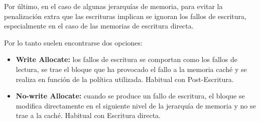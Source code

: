 Por último, en el caso de algunas jerarquías de memoria, para evitar la penalización extra que las escrituras implican se ignoran los fallos de escritura, especialmente en el caso de las memorias de escritura directa.

Por lo tanto suelen encontrarse dos opciones:

\begin{itemize}
  \item \textbf{Write Allocate:} los fallos de escritura se comportan como los fallos de lectura, se trae el bloque que ha provocado el fallo a la memoria caché y se realiza en función de la política utilizada. Habitual con Post-Escritura.
  \item \textbf{No-write Allocate:} cuando se produce un fallo de escritura, el bloque se modifica directamente en el siguiente nivel de la jerarquía de memoria y no se trae a la caché. Habitual con Escritura directa.
\end{itemize}